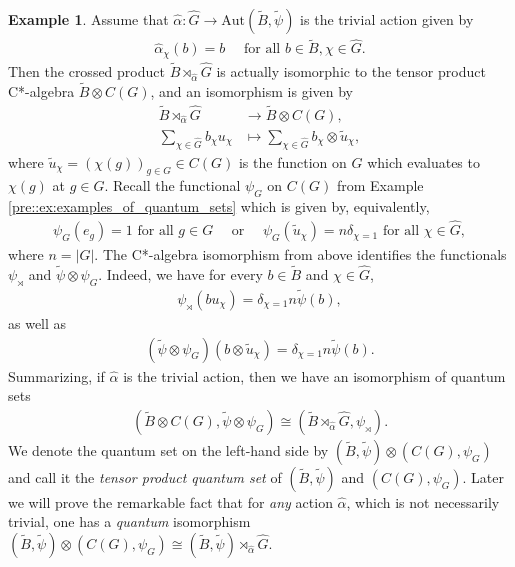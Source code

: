 \documentclass{amsart}
\theoremstyle{definition}
\newtheorem{example}[thm]{Example}
\theoremstyle{definition}
\begin{document}
\begin{example}
    \label{crossed::example:tensor_product_quantum_set}
    Assume that $\hat{\alpha}: \hat{G} \to \mathrm{Aut}(\tilde{B}, \tilde{\psi})$ is the trivial action given by
    \begin{align*}
        \hat{\alpha}_\chi(b) = b \quad \text{ for all } b \in \tilde{B}, \chi \in \hat{G}.
    \end{align*}
    Then the crossed product $\tilde{B} \rtimes_{\hat{\alpha}} \hat{G}$ is actually isomorphic to the tensor product C*-algebra $\tilde{B} \otimes C(G)$, and an isomorphism is given by
    \begin{align*}
        \tilde{B} \rtimes_{\hat{\alpha}} \hat{G} &\to \tilde{B} \otimes C(G), \\
        \sum_{\chi \in \hat{G}} b_\chi u_\chi &\mapsto \sum_{\chi \in \hat{G}} b_\chi \otimes \tilde{u}_\chi,
    \end{align*}
    where $\tilde{u}_\chi = (\chi(g))_{g \in G} \in C(G)$ is the function on $G$ which evaluates to $\chi(g)$ at $g \in G$.
    Recall the functional $\psi_G$ on $C(G)$ from Example \ref{pre::ex:examples_of_quantum_sets} which is given by, equivalently,
    \begin{align*}
        \psi_G(e_g) = 1 \text{ for all } g \in G 
        \quad \text{ or } \quad 
        \psi_G\left( \tilde{u}_\chi \right) = n \delta_{\chi=1} \text{ for all } \chi \in \hat{G},
    \end{align*}
    where $n = |G|$. 
    The C*-algebra isomorphism from above identifies the functionals $\psi_\rtimes$ and $\tilde{\psi} \otimes \psi_G$.
    Indeed, we have for every $b \in \tilde{B}$ and $\chi \in \hat{G}$,
    \begin{align*}
        \psi_\rtimes(b u_\chi) = \delta_{\chi=1} n \tilde{\psi}(b),
    \end{align*}
    as well as
    \begin{align*}
        (\tilde{\psi} \otimes \psi_G)(b \otimes \tilde{u}_\chi) 
            = \delta_{\chi=1} n \tilde{\psi}(b).
    \end{align*}
    Summarizing, if $\hat{\alpha}$ is the trivial action, then we have an isomorphism of quantum sets
    \begin{align*}
        (\tilde{B} \otimes C(G), \tilde{\psi} \otimes \psi_G) \cong (\tilde{B} \rtimes_{\hat{\alpha}} \hat{G}, \psi_\rtimes).
    \end{align*}
    We denote the quantum set on the left-hand side by $(\tilde{B}, \tilde{\psi}) \otimes (C(G), \psi_G)$ and call it the \emph{tensor product quantum set} of $(\tilde{B}, \tilde{\psi})$ and $(C(G), \psi_G)$.
    Later we will prove the remarkable fact that for \emph{any} action $\hat{\alpha}$, which is not necessarily trivial, one has a \emph{quantum} isomorphism 
    $(\tilde{B}, \tilde{\psi}) \otimes (C(G), \psi_G) \cong (\tilde{B}, \tilde{\psi}) \rtimes_{\hat{\alpha}} \hat{G}$.
\end{example}
\end{document}
